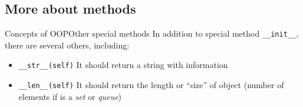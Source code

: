 \documentclass[10pt,compress]{beamer} %
\begin{document}
%		

\subsection{More about methods}

\begin{frame}{Concepts of OOP}{Other special methods}
In addition to special method \texttt{\_\_init\_\_}, there are several others, including:\\
	\begin{block}{}
		\vspace{-0.15cm}
		\begin{itemize}
		\item \footnotesize{\texttt{\_\_str\_\_(self)} It should return a string with information}
		\item \footnotesize{\texttt{\_\_len\_\_(self)} It should return the length or ``size'' of object (number of elements if is a \textit{set} or \textit{queue})}
		\end{itemize}
		\vspace{-0.2cm}
	\end{block}	

		\vspace{-0.2cm}

	\begin{exampleblock}{}
	\vspace{-0.3cm} 
		
	\vspace{-0.2cm}
	\end{exampleblock}
\end{frame}
\end{document}
